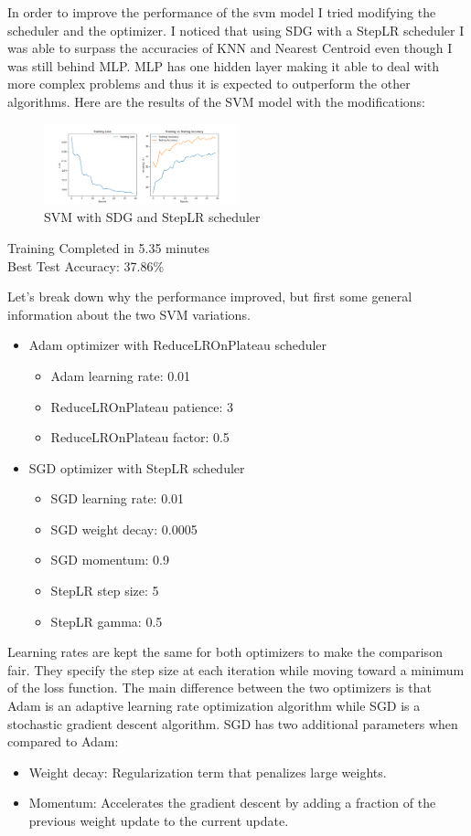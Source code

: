 In order to improve the performance of the svm model I tried modifying the scheduler
and the optimizer. I noticed that using SDG with a StepLR scheduler I was able to 
surpass the accuracies of KNN and Nearest Centroid even though I was still behind MLP.
MLP has one hidden layer making it able to deal with more complex problems and thus 
it is expected to outperform the other algorithms. Here are the results of the SVM 
model with the modifications:
\begin{figure}[H]
    \centering
    \includegraphics[width=0.5\textwidth]{media/svm_modified.png}
    \caption{SVM with SDG and StepLR scheduler}
\end{figure}
Training Completed in 5.35 minutes \\
Best Test Accuracy: 37.86\% \\

\smallskip

Let's break down why the performance improved, but first some general information
about the two SVM variations.
\begin{itemize}
    \item Adam optimizer with ReduceLROnPlateau scheduler
    \begin{itemize}
        \item Adam learning rate: 0.01
        \item ReduceLROnPlateau patience: 3
        \item ReduceLROnPlateau factor: 0.5
    \end{itemize}
    \item SGD optimizer with StepLR scheduler
    \begin{itemize}
        \item SGD learning rate: 0.01
        \item SGD weight decay: 0.0005
        \item SGD momentum: 0.9
        \item StepLR step size: 5
        \item StepLR gamma: 0.5
    \end{itemize}
\end{itemize}
Learning rates are kept the same for both optimizers to make the comparison fair.
They specify the step size at each iteration while moving toward a minimum of the 
loss function. The main difference between the two optimizers is that Adam is an 
adaptive learning rate optimization algorithm while SGD is a stochastic gradient 
descent algorithm. SGD has two additional parameters when compared to Adam:
\begin{itemize}
    \item Weight decay: Regularization term that penalizes large weights.
    \item Momentum: Accelerates the gradient descent by adding a fraction of the
    previous weight update to the current update. 
\end{itemize}

